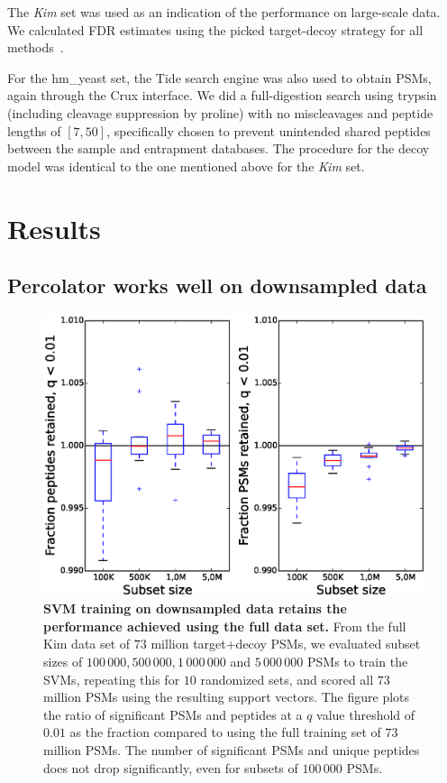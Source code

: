 \documentclass{article}
\begin{document}
The {\em Kim} set was used as an indication of the performance on
large-scale data. We calculated FDR estimates
using the picked target-decoy strategy for all
methods~\cite{savitski2015scalable}.

For the hm\_yeast set, the Tide search engine was also used to obtain
PSMs, again through the Crux interface. We did a full-digestion search
using trypsin (including cleavage suppression by proline) with no
miscleavages and peptide lengths of $[7,50]$, specifically chosen to
prevent unintended shared peptides between the sample and entrapment
databases. The procedure for the decoy model was identical to the one 
mentioned above for the {\em Kim} set.

\section*{Results}

\subsection*{Percolator works well on downsampled data}

\begin{figure}
\begin{center}
\includegraphics[width=0.6\linewidth]{./img/subset-performance}
\caption{\label{fig:subset}\textbf{SVM training on downsampled data
    retains the performance achieved using the full data set.}  From
  the full Kim data set of $73$ million target+decoy PSMs, we
  evaluated subset sizes of $100\,000, 500\,000, 1\,000\,000$ and
  $5\,000\,000$ PSMs to train the SVMs, repeating this for $10$
  randomized sets, and scored all $73$ million PSMs using the
  resulting support vectors. The figure plots the ratio of significant PSMs
  and peptides at a $q$ value threshold of $0.01$ as the fraction
  compared to using the full training set of $73$ million PSMs. The
  number of significant PSMs and unique peptides does not drop
  significantly, even for subsets of $100\,000$ PSMs.
}
\end{center}
\end{figure}
\end{document}
